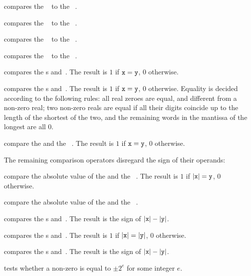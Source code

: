  compares the ~ to the
~.

 compares the ~ to the
~.

 compares the ~ to the
~.

 compares the ~ to the
~.

 compares the s  and~.
The result is $1$ if ${\tt x} = {\tt y}$, $0$ otherwise.

 compares the s  and~.
The result is $1$ if ${\tt x} = {\tt y}$, $0$ otherwise. Equality is decided
according to the following rules: all real zeroes are equal, and
different from a non-zero real; two non-zero reals are equal if all their
digits coincide up to the length of the shortest of the two, and the
remaining words in the mantissa of the longest are all $0$.


 compare the   and
the ~. The result is $1$ if ${\tt x} = {\tt y}$, $0$ otherwise.

The remaining comparison operators disregard the sign of their operands:


 compare the absolute value of the
  and the ~. The result is $1$ if
$|{\tt x}| = {\tt y}$, $0$ otherwise.


 compare the absolute value of the
  and the ~.

 compares the s  and~.
The result is the sign of $|{\tt x}| - |{\tt y}|$.

 compares the s 
and~. The result is $1$ if $|{\tt x}| = |{\tt y}|$, $0$ otherwise.

 compares the s  and~.
The result is the sign of $|{\tt x}| - |{\tt y}|$.

 tests whether a non-zero  
is equal to $\pm 2^e$ for some integer $e$.

